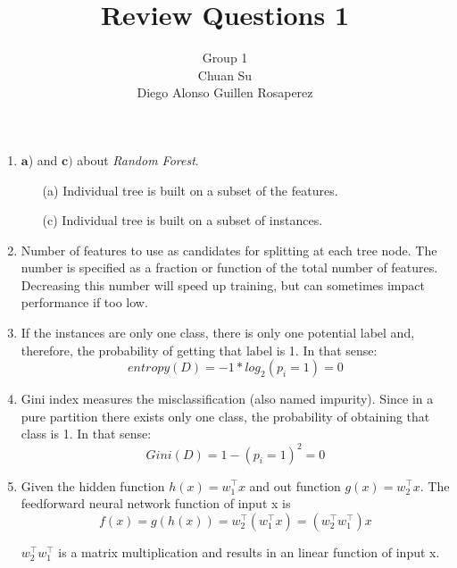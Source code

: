 \documentclass[12pt]{article}
\begin{document}
\title{Review Questions 1}
\author{Group 1 \\ Chuan Su \\ Diego Alonso Guillen Rosaperez}

\maketitle
\begin{enumerate}
	\item $\mathbf{a}$) and $\mathbf{c)}$ about \textit{Random Forest}.
	\begin{enumerate}
		\item[(a)] Individual tree is built on a subset of the features.
		\item[(c)] Individual tree is built on a subset of instances.
	\end{enumerate}
\item Number of features to use as candidates for splitting at each tree node. The number is specified as a fraction or function of the total number of features. Decreasing this number will speed up training, but can sometimes impact performance if too low.
\item If the instances are only one class, there is only one potential label and, therefore, the probability of getting that label is 1. In that sense:\\
\[entropy(D) = -1*log_2(p_i = 1) = 0\]
\item Gini index measures the misclassification (also named impurity). Since in a pure partition there exists only one class, the probability of obtaining that class is 1. In that sense: \\
\[Gini(D) = 1-(p_i = 1)^2 = 0\]
\item Given the hidden function $h(x) = w_1^\intercal x$ and 
out function $g(x) = w_2^\intercal x$. 
The feedforward neural network function of input x is 
\[f(x) = g(h(x)) = w_2^\intercal (w_1^\intercal x) = (w_2^\intercal w_1^\intercal) x\]

$w_2^\intercal w_1^\intercal$ is a matrix multiplication and results in an linear function of input x.


\end{enumerate}
\end{document}
